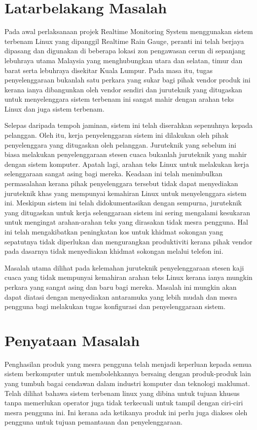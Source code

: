 \section{Latarbelakang Masalah}
Pada awal perlaksanaan projek Realtime Monitoring System menggunakan sistem terbenam Linux yang dipanggil Realtime Rain Gauge, peranti ini telah berjaya dipasang dan digunakan di beberapa lokasi zon pengawasan cerun di sepanjang lebuhraya utama Malaysia yang menghubungkan utara dan selatan, timur dan barat serta lebuhraya disekitar Kuala Lumpur. Pada masa itu, tugas penyelenggaraan bukanlah satu perkara yang sukar bagi pihak vendor produk ini kerana ianya dibangunkan oleh vendor sendiri dan juruteknik yang ditugaskan untuk menyelenggara sistem terbenam ini sangat mahir dengan arahan teks Linux dan juga sistem terbenam.

Selepas daripada tempoh jaminan, sistem ini telah diserahkan sepenuhnya kepada pelanggan. Oleh itu, kerja penyelenggaran sistem ini dilakukan oleh pihak penyelenggara yang ditugaskan oleh pelanggan. Juruteknik yang sebelum ini biasa melakukan penyelenggaraan stesen cuaca bukanlah juruteknik yang mahir dengan sistem komputer. Apatah lagi, arahan teks Linux untuk melakukan kerja selenggaraan sangat asing bagi mereka. Keadaan ini telah menimbulkan permasalahan kerana pihak penyelenggara tersebut tidak dapat menyediakan juruteknik khas yang mempunyai kemahiran Linux untuk menyelenggara sistem ini. Meskipun sistem ini telah didokumentasikan dengan sempurna, juruteknik yang ditugaskan untuk kerja selenggaraan sistem ini sering mengalami kesukaran untuk mengingat arahan-arahan teks yang dirasakan tidak mesra pengguna. Hal ini telah mengakibatkan peningkatan kos untuk khidmat sokongan yang sepatutnya tidak diperlukan dan mengurangkan produktiviti kerana pihak vendor pada dasarnya tidak menyediakan khidmat sokongan melalui telefon ini.

Masalah utama dilihat pada kelemahan juruteknik penyelenggaraan stesen kaji cuaca yang tidak mempunyai kemahiran arahan teks Linux kerana ianya mungkin perkara yang sangat asing dan baru bagi mereka. Masalah ini mungkin akan dapat diatasi dengan menyediakan antaramuka yang lebih mudah dan mesra pengguna bagi melakukan tugas konfigurasi dan penyelenggaraan sistem.

\section{Penyataan Masalah}
Penghasilan produk yang mesra pengguna telah menjadi keperluan kepada semua sistem berkomputer untuk membolehkannya bersaing dengan produk-produk lain yang tumbuh bagai cendawan dalam industri komputer dan teknologi maklumat. Telah dilihat bahawa sistem terbenam linux yang dibina untuk tujuan khusus tanpa memerlukan operator juga tidak terkecuali untuk tampil dengan ciri-ciri mesra pengguna ini. Ini kerana ada ketikanya produk ini perlu juga diakses oleh pengguna untuk tujuan pemantauan dan penyelenggaraan.

